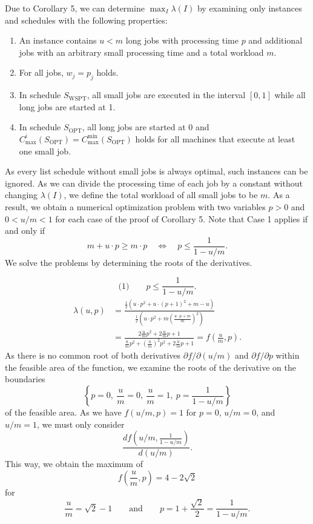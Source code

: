 \documentclass[11pt]{article}
\newcommand{\WSPT}{\mathrm{WSPT}}
\newcommand{\OPT}{\mathrm{OPT}}
\newcommand{\Cmin}{C_{\max}^{\min}}
\begin{document}
Due to Corollary 5, we can determine $\max_I\lambda(I)$ by examining only
instances and schedules with the following properties:
\begin{enumerate}[label=(\arabic*)]
\item An instance contains $u<m$ long jobs with processing time $p$ and
additional jobs with an arbitrary small processing time and a total workload
$m$.
\item For all jobs, $w_j=p_j$ holds.
\item In schedule $S_{\WSPT}$, all small jobs are executed in the interval
$[0,1]$ while all long jobs are started at 1.
\item In schedule $S_{\OPT}$, all long jobs are started at 0 and
$C_{\max}^i(S_{\OPT})=\Cmin(S_{\OPT})$ holds for all machines that execute at
least one small job.
\end{enumerate}
As every list schedule without small jobs is always optimal, such instances
can be ignored. As we can divide the processing time of each job by a
constant without changing $\lambda(I)$, we define the total workload of all
small jobs to be $m$. As a result, we obtain a numerical optimization problem
with two variables $p>0$ and $0<u/m<1$ for each case of the proof of
Corollary 5. Note that Case 1 applies if and only if
\[
        m+u\cdot p\geq m\cdot p
        \quad\Longleftrightarrow\quad
        p\leq \frac1{1-u/m}.
\]
We solve the problems by determining the roots of the derivatives.

\[
\text{(1)}\qquad p\leq \frac1{1-u/m}.
\]
\[
\begin{aligned}
        \lambda(u,p)
        &=
        \frac{\frac12(u\cdot p^2+u\cdot(p+1)^2+m-u)}
        {\frac12\left(u\cdot p^2
        +m\left(\frac{u\cdot p+m}{m}\right)^2\right)}             \\
        &=
        \frac{2\frac{u}{m}p^2+2\frac{u}{m}p+1}
        {\frac{u}{m}p^2+\left(\frac{u}{m}\right)^2p^2
        +2\frac{u}{m}p+1}
        =
        f\left(\frac{u}{m},p\right).
\end{aligned}
\]
As there is no common root of both derivatives
$\partial f/\partial(u/m)$ and $\partial f/\partial p$ within the feasible
area of the function, we examine the roots of the derivative on the
boundaries
\[
        \left\{
            p=0,\ \frac{u}{m}=0,\ \frac{u}{m}=1,\
            p=\frac1{1-u/m}
        \right\}
\]
of the feasible area. As we have $f(u/m,p)=1$ for
$p=0$, $u/m=0$, and $u/m=1$, we must only consider
\[
        \frac{d f\left(u/m,\frac1{1-u/m}\right)}{d(u/m)}.
\]
This way, we obtain the maximum of
\[
        f\left(\frac{u}{m},p\right)=4-2\sqrt{2}
\]
for
\[
        \frac{u}{m}=\sqrt{2}-1
        \qquad\text{and}\qquad
        p=1+\frac{\sqrt{2}}2=\frac1{1-u/m}.
\]
\end{document}
